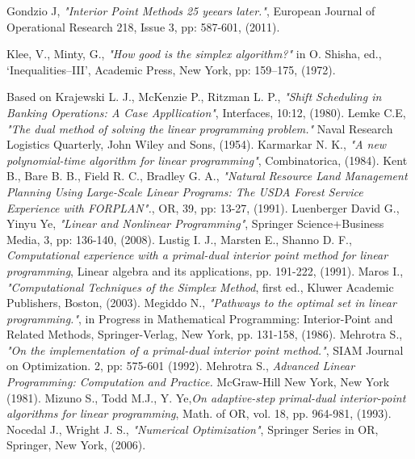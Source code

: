 \documentclass[a4paper,10 pt,titlepage,twoside]{book}
\theoremstyle{plain}
\theoremstyle{definition}
\theoremstyle{remark}
\begin{document}
\begin{thebibliography}{9}
	 Gondzio J, \textit{ "Interior Point Methods 25 yeears later."}, European Journal of Operational Research 218, Issue 3, pp: 587-601, (2011).	
	
		 Klee, V., Minty, G., \emph{ "How good is the simplex algorithm?"} in O. Shisha, ed.,
	‘Inequalities–III’, Academic Press, New York, pp: 159–175, (1972).

		Based on Krajewski L. J., McKenzie P., Ritzman L. P., \textit{ "Shift Scheduling in Banking Operations: A Case Appllication"}, Interfaces, 10:12, (1980).
		 Lemke C.E, \textit{ "The dual method of solving the linear programming problem."} Naval Research Logistics Quarterly, John Wiley and Sons, (1954).
		 Karmarkar N. K.,\emph{ "A new polynomial-time algorithm for linear programming"}, Combinatorica, (1984).
		 Kent B., Bare B. B., Field R. C., Bradley G. A., \textit{"Natural Resource Land Management Planning Using Large-Scale Linear Programs: The USDA Forest Service Experience with FORPLAN".}, OR, 39, pp: 13-27, (1991).
		Luenberger David G., Yinyu Ye, \emph{"Linear and Nonlinear Programming"}, Springer Science+Business Media, 3, pp: 136-140, (2008).
		 Lustig I. J., Marsten E., Shanno D. F., \emph{ Computational experience with a primal-dual interior point method for linear programming}, Linear algebra and its applications, pp. 191-222, (1991).
		 Maros I., \emph{ "Computational Techniques of the Simplex Method}, first ed., Kluwer
		Academic Publishers, Boston, (2003).
		 Megiddo N., \emph{ "Pathways to the optimal set in linear programming."}, in Progress in Mathematical Programming: Interior-Point and Related Methods, Springer-Verlag, New York, pp. 131-158, (1986).
	 Mehrotra S., \emph{ "On the implementation of a primal-dual interior point method."}, SIAM Journal on Optimization. 2, pp: 575-601 (1992).
	 Mehrotra S., \emph{ Advanced Linear Programming: Computation and
	Practice. } McGraw-Hill New York, New York (1981).
		Mizuno S., Todd M.J., Y. Ye,\emph{\;On adaptive-step primal-dual interior-point algorithms for linear programming}, Math. of OR, vol. 18, pp. 964-981, (1993). 
	Nocedal J., Wright J. S., \emph{\;"Numerical Optimization"}, Springer Series in OR, Springer, New York, (2006).



\end{thebibliography}
\end{document}
